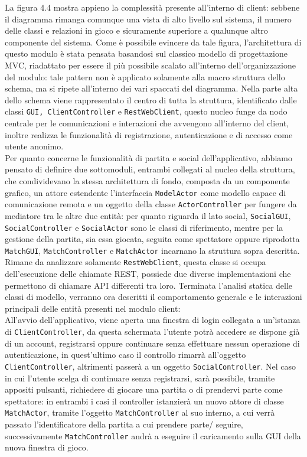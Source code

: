 La figura 4.4 mostra appieno la complessità presente all'interno di client: sebbene il diagramma rimanga comunque una vista di alto livello sul sistema, il numero delle classi e relazioni in gioco e sicuramente superiore a qualunque altro componente del sistema.
Come è possibile evincere da tale figura, l'architettura di questo modulo è stata pensata basandosi sul classico modello di progettazione MVC, riadattato per essere il più possibile scalato all'interno dell'organizzazione del modulo: tale pattern non è applicato solamente alla macro struttura dello schema, ma si ripete all'interno dei vari spaccati del diagramma.
Nella parte alta dello schema viene rappresentato il centro di tutta la struttura, identificato dalle classi \texttt{GUI, ClientController} e \texttt{RestWebClient}, questo nucleo funge da nodo centrale per le comunicazioni e interazioni che avvengono all'interno del client, inoltre realizza le funzionalità di registrazione, autenticazione e di accesso come utente anonimo.\\
Per quanto concerne le funzionalità di partita e social dell'applicativo, abbiamo pensato di definire due sottomoduli, entrambi collegati al nucleo della struttura, che condividevano la stessa architettura di fondo, composta da un componente grafico, un attore estendente l'interfaccia \texttt{ModelActor} come modello capace di comunicazione remota e un oggetto della classe \texttt{ActorController} per fungere da mediatore tra le altre due entità: per quanto riguarda il lato social, \texttt{SocialGUI}, \texttt{SocialController} e \texttt{SocialActor} sono le classi di riferimento, mentre per la gestione della partita, sia essa giocata, seguita come spettatore oppure riprodotta \texttt{MatchGUI}, \texttt{MatchController} e \texttt{MatchActor} incarnano la struttura sopra descritta.\\
Rimane da analizzare solamente \texttt{RestWebClient}, questa classe si occupa dell'esecuzione delle chiamate REST, possiede due diverse implementazioni che permettono di chiamare API differenti tra loro.
Terminata l'analisi statica delle classi di modello, verranno ora descritti il comportamento generale e le interazioni principali delle entità presenti nel modulo client:\\ 
All'avvio dell'applicativo, viene aperta una finestra di login collegata a un'istanza di \texttt{ClientController}, da questa schermata l'utente potrà accedere se dispone già di un account, registrarsi oppure continuare senza effettuare nessun operazione di autenticazione, in quest'ultimo caso il controllo rimarrà all'oggetto \texttt{ClientController}, altrimenti passerà a un oggetto \texttt{SocialController}. Nel caso in cui l'utente scelga di continuare senza registrarsi, sarà possibile, tramite appositi pulsanti, richiedere di giocare una partita o di prendervi parte come spettatore: in entrambi i casi il controller istanzierà un nuovo attore di classe \texttt{MatchActor}, tramite l'oggetto \texttt{MatchController} al suo interno, a cui verrà passato l'identificatore della partita a cui prendere parte/ seguire, successivamente \texttt{MatchController} andrà a eseguire il caricamento sulla GUI della nuova finestra di gioco.
